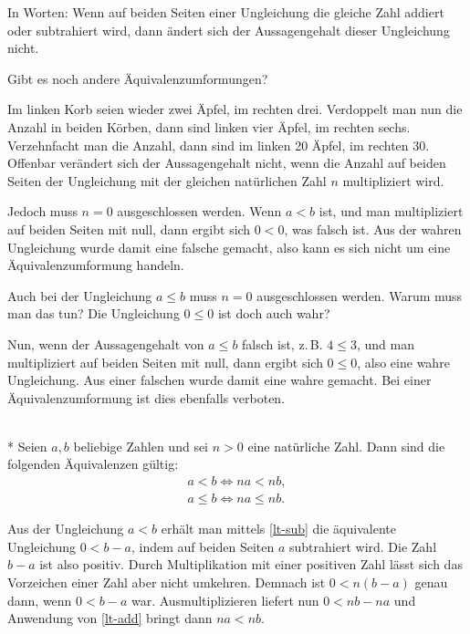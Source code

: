 \noindent
In Worten: Wenn auf beiden Seiten einer Ungleichung die gleiche
Zahl addiert oder subtrahiert wird, dann ändert sich der Aussagengehalt
dieser Ungleichung nicht.

Gibt es noch andere Äquivalenzumformungen?

Im linken Korb seien wieder zwei Äpfel, im rechten drei. Verdoppelt
man nun die Anzahl in beiden Körben, dann sind linken vier Äpfel,
im rechten sechs. Verzehnfacht man die Anzahl, dann sind im linken
20 Äpfel, im rechten 30. Offenbar verändert sich der Aussagengehalt
nicht, wenn die Anzahl auf beiden Seiten der Ungleichung mit
der gleichen natürlichen Zahl $n$ multipliziert wird.

Jedoch muss $n=0$ ausgeschlossen werden. Wenn $a<b$ ist, und man
multipliziert auf beiden Seiten mit null, dann ergibt sich
$0<0$, was falsch ist. Aus der wahren Ungleichung wurde damit eine
falsche gemacht, also kann es sich nicht um eine Äquivalenzumformung
handeln.

Auch bei der Ungleichung $a\le b$ muss $n=0$ ausgeschlossen werden.
Warum muss man das tun? Die Ungleichung $0\le 0$ ist doch auch
wahr?

Nun, wenn der Aussagengehalt von $a\le b$ falsch ist, z.\,B. $4\le 3$,
und man multipliziert auf beiden Seiten mit null, dann ergibt sich
$0\le 0$, also eine wahre Ungleichung. Aus einer falschen wurde damit
eine wahre gemacht. Bei einer Äquivalenzumformung ist dies ebenfalls
verboten.

\begin{Satz}\mbox{}\\*
Seien $a,b$ beliebige Zahlen und sei $n>0$ eine natürliche Zahl.
Dann sind die folgenden Äquivalenzen gültig:
\begin{gather}
\label{lt-mul-nat} a<b\iff na<nb,\\
\label{le-mul-nat} a\le b\iff na\le nb.
\end{gather}
\end{Satz}

\noindent{}
Aus der Ungleichung $a<b$ erhält man mittels \eqref{lt-sub} die
äquivalente Ungleichung $0<b-a$, indem auf beiden Seiten $a$
subtrahiert wird. Die Zahl $b-a$ ist also positiv. Durch Multiplikation
mit einer positiven Zahl lässt sich das Vorzeichen einer Zahl
aber nicht umkehren. Demnach ist $0<n(b-a)$ genau dann,
wenn $0<b-a$ war. Ausmultiplizieren liefert nun
$0<nb-na$ und Anwendung von \eqref{lt-add} bringt dann $na<nb$.

